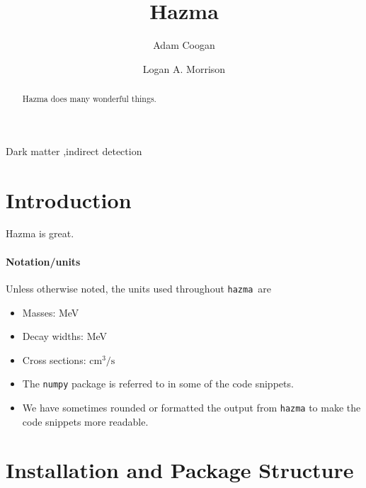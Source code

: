 \documentclass[review]{elsarticle}
\newcommand{\mil}[1]{\texttt{#1}}
\renewcommand\u[1]{{\mathrm{#1}}}
\newcommand{\hazma}{\mil{hazma}}
\begin{document}
\begin{frontmatter}

	\title{Hazma}

	\author[grappa,ucsc,scipp]{Adam Coogan}

	\author[ucsc,scipp]{Logan A. Morrison}

	\address[grappa]{GRAPPA, Institute of Physics, University of Amsterdam, 1098 XH Amsterdam, The Netherlands}
	\address[ucsc]{Department of Physics, 1156 High St., University of California Santa Cruz, Santa Cruz, CA 95064, USA}
	\address[scipp]{Santa Cruz Institute for Particle Physics, 1156 High St., Santa Cruz, CA 95064, USA}

	\begin{abstract}
		Hazma does many wonderful things.
	\end{abstract}

	\begin{keyword}
		Dark matter \sep indirect detection
	\end{keyword}

\end{frontmatter}

\section{Introduction}

Hazma is great.

\paragraph{Notation/units} Unless otherwise noted, the units used throughout \hazma\ are
\begin{itemize}
    \item Masses: MeV
    \item Decay widths: MeV
    \item Cross sections: $\u{cm}^3 / \u{s}$
    \item The \mil{numpy} package is referred to in some of the code snippets.
    \item We have sometimes rounded or formatted the output from \mil{hazma} to make the code snippets more readable.
\end{itemize}

\section{Installation and Package Structure}%
\label{sec:installation}
\end{document}
